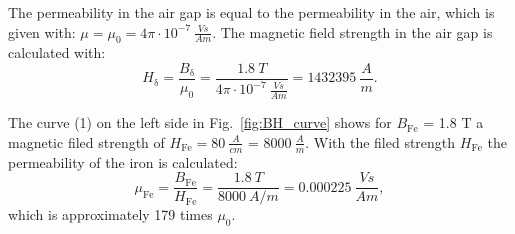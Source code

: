 \begin{solutionblock}
    The permeability in the air gap is equal to the permeability in the air, which is given with: \newline $\mu = \mu_{\mathrm{0}} = 4 \pi \cdot 10^{-7} \ \frac{\si{Vs}}{\si{Am}}$. The magnetic field strength in the air gap is calculated with:
    \begin{equation}
        H_{\mathrm{\updelta}} = \frac{B_{\mathrm{\updelta}}}{\mu_{\mathrm{0}}}
        = \frac{1.8 \ \si{T}}{4 \pi \cdot 10^{-7} \ \frac{\si{Vs}}{\si{Am}}}
        = 1432395 \ \frac{\si{A}}{\si{m}}.
    \end{equation}

    The curve (1) on the left side in Fig.~\ref{fig:BH_curve} shows for $B_{\mathrm{Fe}}$ = 1.8 \si{T} a magnetic filed strength of \newline $H_{\mathrm{Fe}} = 80 \ \frac{\si{A}}{\si{cm}}$ = $8000 \ \frac{\si{A}}{\si{m}}$. With the filed strength $H_{\mathrm{Fe}}$ the permeability of the iron is calculated:
    \begin{equation}
        \mu_{\mathrm{Fe}} = \frac{B_{\mathrm{Fe}}}{H_{\mathrm{Fe}}}
        = \frac{1.8 \ \si{T}}{8000 \ \si{A/m}}
        = 0.000225 \ \frac{\si{Vs}}{\si{Am}},
    \end{equation}
    which is approximately 179 times $\mu_{\mathrm{0}}$.

\end{solutionblock}




